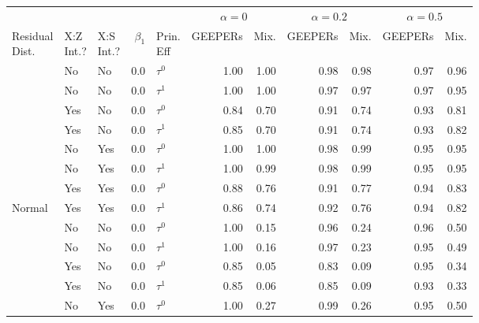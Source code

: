
\begin{tabular}[t]{lllrlrrrrrr}
\toprule
\multicolumn{5}{c}{ } & \multicolumn{2}{c}{$\alpha=0$} & \multicolumn{2}{c}{$\alpha=0.2$} & \multicolumn{2}{c}{$\alpha=0.5$} \\
\cmidrule(l{3pt}r{3pt}){6-7} \cmidrule(l{3pt}r{3pt}){8-9} \cmidrule(l{3pt}r{3pt}){10-11}
\makecell[l]{Residual\\Dist.} & \makecell[c]{X:Z\\Int.?} & \makecell[r]{X:S\\Int.?} & $\beta_1$ & \makecell[c]{Prin.\\Eff} & GEEPERs & Mix. & GEEPERs & Mix. & GEEPERs & Mix.\\
\midrule
 & No & No & 0.0 & $\tau^0$ & 1.00 & 1.00 & 0.98 & 0.98 & 0.97 & 0.96\\

 & No & No & 0.0 & $\tau^1$ & 1.00 & 1.00 & 0.97 & 0.97 & 0.97 & 0.95\\

 & Yes & No & 0.0 & $\tau^0$ & 0.84 & 0.70 & 0.91 & 0.74 & 0.93 & 0.81\\

 & Yes & No & 0.0 & $\tau^1$ & 0.85 & 0.70 & 0.91 & 0.74 & 0.93 & 0.82\\

 & No & Yes & 0.0 & $\tau^0$ & 1.00 & 1.00 & 0.98 & 0.99 & 0.95 & 0.95\\

 & No & Yes & 0.0 & $\tau^1$ & 1.00 & 0.99 & 0.98 & 0.99 & 0.95 & 0.95\\

 & Yes & Yes & 0.0 & $\tau^0$ & 0.88 & 0.76 & 0.91 & 0.77 & 0.94 & 0.83\\

\multirow{-8}{*}{\raggedright\arraybackslash Normal} & Yes & Yes & 0.0 & $\tau^1$ & 0.86 & 0.74 & 0.92 & 0.76 & 0.94 & 0.82\\
\cmidrule{1-11}
 & No & No & 0.0 & $\tau^0$ & 1.00 & 0.15 & 0.96 & 0.24 & 0.96 & 0.50\\

 & No & No & 0.0 & $\tau^1$ & 1.00 & 0.16 & 0.97 & 0.23 & 0.95 & 0.49\\

 & Yes & No & 0.0 & $\tau^0$ & 0.85 & 0.05 & 0.83 & 0.09 & 0.95 & 0.34\\

 & Yes & No & 0.0 & $\tau^1$ & 0.85 & 0.06 & 0.85 & 0.09 & 0.93 & 0.33\\

 & No & Yes & 0.0 & $\tau^0$ & 1.00 & 0.27 & 0.99 & 0.26 & 0.95 & 0.50\\


\end{tabular}
